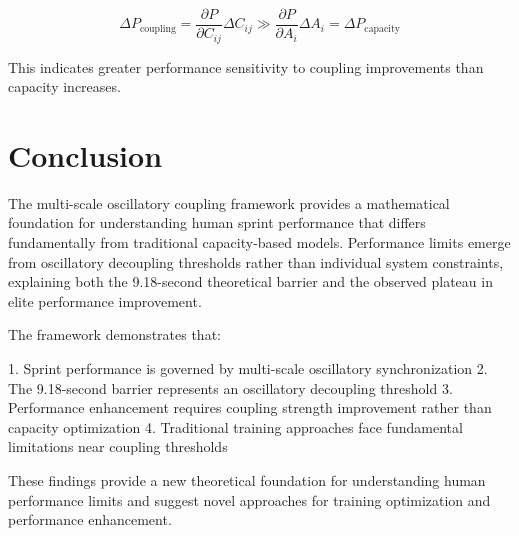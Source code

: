 \documentclass[twocolumn]{article}
\begin{document}
\begin{equation}
\Delta P_{\text{coupling}} = \frac{\partial P}{\partial C_{ij}} \Delta C_{ij} \gg \frac{\partial P}{\partial A_i} \Delta A_i = \Delta P_{\text{capacity}}
\label{eq:enhancement_comparison}
\end{equation}

This indicates greater performance sensitivity to coupling improvements than capacity increases.

\section{Conclusion}

The multi-scale oscillatory coupling framework provides a mathematical foundation for understanding human sprint performance that differs fundamentally from traditional capacity-based models. Performance limits emerge from oscillatory decoupling thresholds rather than individual system constraints, explaining both the 9.18-second theoretical barrier and the observed plateau in elite performance improvement.

The framework demonstrates that:

1. Sprint performance is governed by multi-scale oscillatory synchronization
2. The 9.18-second barrier represents an oscillatory decoupling threshold
3. Performance enhancement requires coupling strength improvement rather than capacity optimization
4. Traditional training approaches face fundamental limitations near coupling thresholds

These findings provide a new theoretical foundation for understanding human performance limits and suggest novel approaches for training optimization and performance enhancement.



\end{document}
